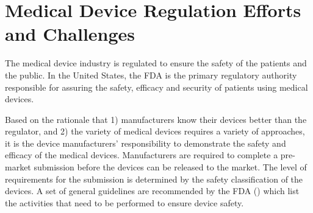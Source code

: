 \section{Medical Device Regulation Efforts and Challenges}
The medical device industry is regulated to ensure the safety of the patients and the public. In the United States, the FDA is the primary regulatory authority responsible for assuring the safety, efficacy and security of patients using medical devices. 


Based on the rationale that 1) manufacturers know their devices better than the regulator, and 2) the variety of medical devices requires a variety of approaches, it is the device manufacturers' responsibility to demonstrate the safety and efficacy of the medical devices. Manufacturers are required to complete a pre-market submission before the devices can be released to the market. The level of requirements for the submission is determined by the safety classification of the devices. A set of general guidelines are recommended by the FDA (\cite{fda1, fda2, fda3}) which list the activities that need to be performed to ensure device safety. 

